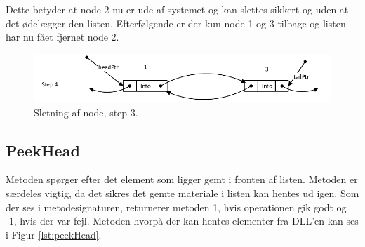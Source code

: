 Dette betyder at node 2 nu er ude af systemet og kan slettes sikkert og uden at det ødelægger den listen. Efterfølgende er der kun node 1 og 3 tilbage og listen har nu fået fjernet node 2.

\begin{figure}[ht]
\centering
\includegraphics[width=\textwidth-5cm]{../fig/linkedNodStep4.pdf}
\caption{Sletning af node, step 3.}
\label{fig:step4}
\end{figure}

\subsection{PeekHead}

Metoden spørger efter det element som ligger gemt i fronten af listen. Metoden er særdeles vigtig, da det sikres det gemte materiale i listen kan hentes ud igen. Som der ses i metodesignaturen, returnerer metoden 1, hvis operationen gik godt og -1, hvis der var fejl. Metoden hvorpå der kan hentes elementer fra DLL'en kan ses i Figur \ref{lst:peekHead}.
